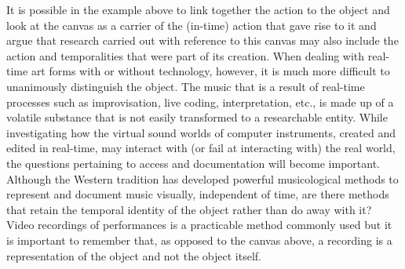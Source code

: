 It is possible in the example above to link together the action to the object and look at the canvas as a carrier of the (in-time) action that gave rise to it and argue that research carried out with reference to this canvas may also include the action and temporalities that were part of its creation. When dealing with real-time art forms with or without technology, however, it is much more difficult to unanimously distinguish the object. The music that is a result of real-time processes such as improvisation, live coding, interpretation, etc., is made up of a volatile substance that is not easily transformed to a researchable entity. While investigating how the virtual sound worlds of computer instruments, created and edited in real-time, may interact with (or fail at interacting with) the real world, the questions pertaining to access and documentation will become important. Although the Western tradition has developed powerful musicological methods to represent and document music visually, \citep{bregman94} independent of time, are there methods that retain the temporal identity of the object rather than do away with it? Video recordings of performances is a practicable method commonly used but it is important to remember that, as opposed to the canvas above, a recording is a representation of the object and not the object itself.





